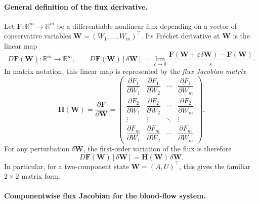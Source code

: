 \documentclass[11pt]{article}
\newcommand{\R}{\mathbb{R}}
\begin{document}
\paragraph{General definition of the flux derivative.}

Let $\mathbf{F}:\R^m\to\R^m$ be a differentiable nonlinear flux
depending on a vector of conservative variables
$\mathbf{W}=(W_1,\ldots,W_m)^{\!\top}$.
Its Fréchet derivative at $\mathbf{W}$ is the linear map
\[
  D\mathbf{F}(\mathbf{W}) : \R^m \to \R^m, \qquad
  D\mathbf{F}(\mathbf{W})[\delta\mathbf{W}]
  = \lim_{\varepsilon\to0}
    \frac{\mathbf{F}(\mathbf{W}+\varepsilon\delta\mathbf{W})
          -\mathbf{F}(\mathbf{W})}{\varepsilon}.
\]
In matrix notation, this linear map is represented by the
\emph{flux Jacobian matrix}
\[
  \mathbf{H}(\mathbf{W})
  = \frac{\partial\mathbf{F}}{\partial\mathbf{W}}
  =
  \begin{pmatrix}
    \dfrac{\partial F_1}{\partial W_1} &
    \dfrac{\partial F_1}{\partial W_2} & \cdots &
    \dfrac{\partial F_1}{\partial W_m} \\[1mm]
    \dfrac{\partial F_2}{\partial W_1} &
    \dfrac{\partial F_2}{\partial W_2} & \cdots &
    \dfrac{\partial F_2}{\partial W_m} \\[-1mm]
    \vdots & \vdots & \ddots & \vdots \\[-1mm]
    \dfrac{\partial F_m}{\partial W_1} &
    \dfrac{\partial F_m}{\partial W_2} & \cdots &
    \dfrac{\partial F_m}{\partial W_m}
  \end{pmatrix}.
\]
For any perturbation $\delta\mathbf{W}$, the first-order variation of the flux
is therefore
\[
  D\mathbf{F}(\mathbf{W})[\delta\mathbf{W}]
  = \mathbf{H}(\mathbf{W})\,\delta\mathbf{W}.
\]
In particular, for a two-component state $\mathbf{W}=(A,U)^{\!\top}$,
this gives the familiar $2\times2$ matrix form.

\vspace{0.5em}
\paragraph{Componentwise flux Jacobian for the blood-flow system.}
\end{document}
